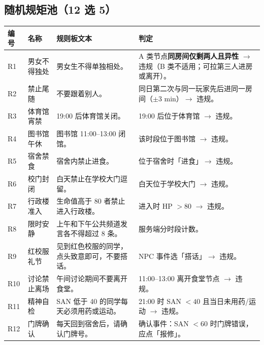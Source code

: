 \documentclass[UTF8, fontset=none, 11pt]{ctexart}
\begin{document}
\subsection{随机规矩池（12 选 5）}
\begin{longtable}{p{0.7cm}p{2.4cm}p{5cm}p{6.2cm}}
\toprule
编号 & 名称 & 规则板文本 & 判定 \\
\midrule
\endhead
R1 & 男女不得独处 & 男女生不得单独相处。 & A 类节点\textbf{同房间仅剩两人且异性} $\to$ 违规（B 类不适用；可拉第三人进房或离开）。 \\
R2 & 禁止尾随 & 不要跟着别人。 & 同日第二次与同一玩家先后进同一房间（$\pm3$ min）$\to$ 违规。 \\
R3 & 体育馆宵禁 & 19:00 后体育馆关闭。 & 19:00 后位于体育馆 $\to$ 违规。 \\
R4 & 图书馆午休 & 图书馆 11:00--13:00 闭馆。 & 该时段位于图书馆 $\to$ 违规。 \\
R5 & 宿舍禁食 & 宿舍内禁止进食。 & 位于宿舍时「进食」$\to$ 违规。 \\
R6 & 校门封闭 & 白天禁止在学校大门逗留。 & 白天位于学校大门 $\to$ 违规。 \\
R7 & 行政楼准入 & 生命值高于 80 者禁止进入行政楼。 & 进入时 HP $>80$ $\to$ 违规。 \\
R8 & 限时安静 & 上午和下午公共频道发言各不得超过 8 条。 & 服务端分时段计数。 \\
R9 & 红校服礼节 & 见到红色校服的同学，点头致意即可，不要搭话。 & NPC 事件选「搭话」$\to$ 违规。 \\
R10 & 讨论禁止离场 & 午间讨论期间不要离开食堂。 & 11:00--13:00 离开食堂节点 $\to$ 违规。 \\
R11 & 精神自检 & SAN 低于 40 的同学每天必须用药或运动。 & 21:00 时 SAN $<40$ 且当日未用药/运动 $\to$ 违规。 \\
R12 & 门牌确认 & 每天回到宿舍后，请确认门牌号。 & 确认事件：SAN $<60$ 时门牌错误，应点「报修」。 \\
\bottomrule
\end{longtable}
\end{document}
